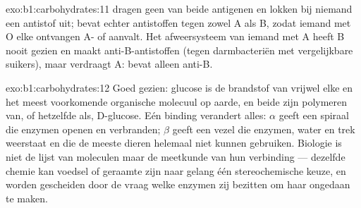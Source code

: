 \begin{solution}{exo:b1:carbohydrates:11}
 dragen geen van beide antigenen en lokken bij niemand een antistof uit;
 bevat echter antistoffen tegen zowel A als B, zodat iemand met O elke
ontvangen A- of  aanvalt. Het afweersysteem van iemand met A heeft B nooit
gezien en maakt anti-B-antistoffen (tegen darmbacteriën met vergelijkbare
suikers), maar verdraagt A:  bevat alleen anti-B.
\end{solution}

\begin{solution}{exo:b1:carbohydrates:12}
Goed gezien: glucose is de brandstof van vrijwel elke  en  het meest
voorkomende organische molecuul op aarde, en beide zijn polymeren van, of
hetzelfde als, D-glucose. Eén binding verandert alles: $\alpha$ geeft een spiraal
die enzymen openen en  verbranden; $\beta$ geeft een vezel die enzymen,
water en trek weerstaat en die de meeste dieren helemaal niet kunnen gebruiken.
Biologie is niet de lijst van moleculen maar de meetkunde van hun verbinding ---
dezelfde chemie kan voedsel of geraamte zijn naar gelang één stereochemische
keuze, en  worden gescheiden door de vraag welke enzymen zij bezitten
om haar ongedaan te maken.
\end{solution}

